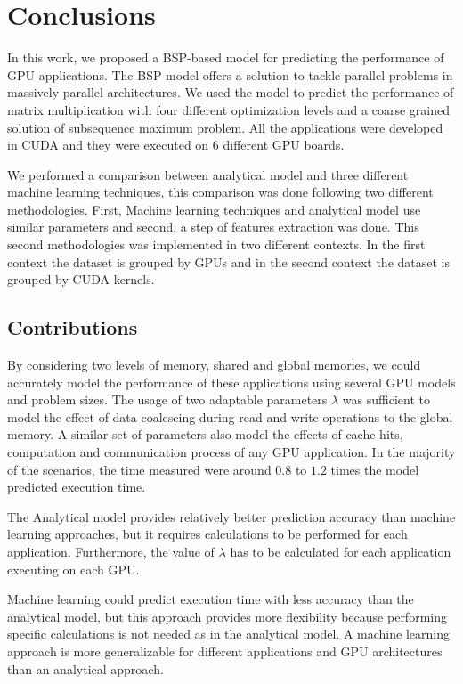 \chapter{Conclusions}
\label{chap:conclusion}

In this work, we proposed a BSP-based model for predicting the performance of GPU applications. The BSP model offers a solution to tackle parallel problems in massively parallel architectures. We used the model to predict the performance of matrix multiplication with four different optimization levels and a coarse grained solution of subsequence maximum problem. All the applications were developed in CUDA and they were executed on 6 different GPU boards.

We performed a comparison between analytical model and three different machine learning techniques, this comparison was done following two different methodologies. First, Machine learning techniques and analytical model use similar parameters and second, a step of features extraction was done. This second methodologies was implemented in two different contexts. In the first context the dataset is grouped by GPUs and in the second context the dataset is grouped by CUDA kernels.


\section{Contributions} 

By considering two levels of memory, shared and global memories, we could accurately model the performance of these applications using several GPU models and problem sizes. The usage of two adaptable parameters $\lambda$ was sufficient to model the effect of data coalescing during read and write operations to the global memory. A similar set of parameters also model the effects of cache hits, computation and communication process of any GPU application. In the majority of the scenarios, the time measured were around $0.8$ to $1.2$ times the model predicted execution time.

The Analytical model provides relatively better prediction accuracy than machine learning approaches, but it requires calculations to be performed for each application. Furthermore, the value of $\lambda$ has to be calculated for each application executing on each GPU.

Machine learning could predict execution time with less accuracy than the analytical model, but this approach provides more flexibility because performing specific calculations is not needed as in the analytical model. A machine learning approach is more generalizable for different applications and GPU architectures than an analytical approach.


